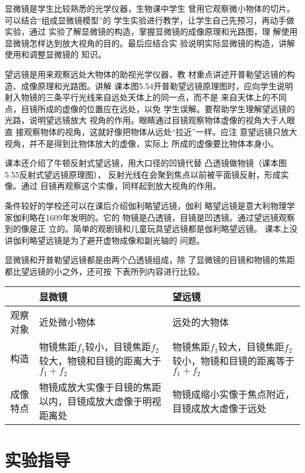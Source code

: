 显微镜是学生比较熟悉的光学仪器，生物课中学生
曾用它观察微小物体的切片。可以结合“组成显微镜模型”的
学生实验进行教学，让学生自己先预习，再动手做实验，通过
实验了解显微镜的构造，掌握显微镜的成像原理和光路图，理
解使用显微镜怎样达到放大视角的目的。最后应结合实
验说明实际显微镜的构造，讲解使用和调整显微镜的
知识。

望远镜是用来观察远处大物体的助视光学仪器，教
材重点讲述开普勒望远镜的构造、成像原理和光路图。讲解
课本图5.54开普勒望远镜原理图时，应向学生说明
射入物镜的三条平行光线来自远处天体上的同一点，而不是
来自天体上的不同点，目镜所成的虚像的位置应在远处，以免
学生误解。要帮助学生理解望远镜的光路，说明望远镜放大
视角的作用。眼睛通过目镜观察物体虚像的视角大于人眼直
接观察物体的视角，这就好像把物体从远处“拉近”一样。应注
意望远镜只放大视角，并不是得到比物体放大的虚像，实际上
所成的虚像要比物体本身小。

课本还介绍了牛顿反射式望远镜，用大口径的凹镜代替
凸透镜做物镜（课本图5.55反射式望远镜原理图），
反射光线在会聚到焦点以前被平面镜反射，形成实像。通过
目镜再观察这个实像，同样起到放大视角的作用。

条件较好的学校还可以在课后介绍伽利略望远镜，伽利
略望远镜是意大利物理学家伽利略在1609年发明的。它的
物镜是凸透镜，目镜是凹透镜。通过望远镜观察到的像是正
立的。简单的观剧镜和儿童玩具望远镜都是伽利略望远镜。
课本上没讲伽利略望远镜是为了避开虚物成像和副光轴的
问题。

显微镜和开普勒望远镜都是由两个凸透镜组成，除
了显微镜的目镜和物镜的焦距都比望远镜的小之外，还可按
下表所列内容进行比较。

\begin{center}
\begin{tabular}{cp{}p{}}
    \hline
   & 显微镜&    望远镜\\
    \hline
    观察对象&近处微小物体&    远处的大物体\\\hline
    构造&物镜焦距$f_1$较小，目镜焦距$f_2$较大，物镜和目镜的距离大于$f_1+f_2$  &
    物镜焦距$f_1$较大，目镜焦距$f_2$较小，物镜和目镜的距离等于$f_1+f_2$\\\hline
    成像特点&物镜成放大实像于目镜的焦距以内，目镜成放大虚像于明视距离处 &
    物镜成缩小实像于焦点附近，目镜成放大虚像于远处 \\
    \hline
\end{tabular}
\end{center}

\section{实验指导}
